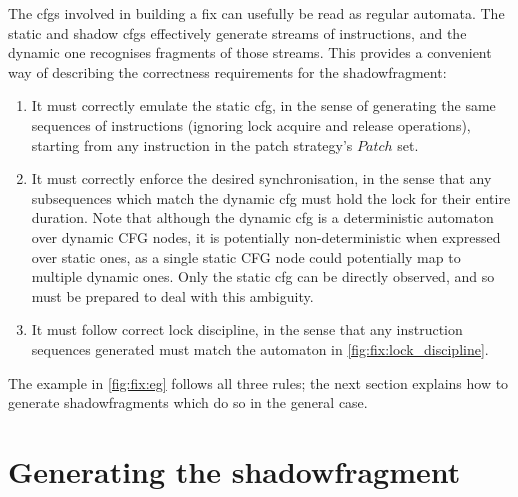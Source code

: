 The \glspl{cfg} involved in building a fix can usefully be read as
regular automata.  The static and shadow \glspl{cfg} effectively
generate streams of instructions, and the dynamic one recognises
fragments of those streams.  This provides a convenient way of
describing the correctness requirements for the \gls{shadowfragment}:
\begin{enumerate}
\item It must correctly emulate the \gls{static cfg}, in the sense of
  generating the same sequences of instructions (ignoring lock acquire
  and release operations), starting from any instruction in the patch
  strategy's $\mathit{Patch}$ set.
\item It must correctly enforce the desired synchronisation, in the
  sense that any subsequences which match the \gls{dynamic cfg} must
  hold the lock for their entire duration.  Note that although the
  \gls{dynamic cfg} is a deterministic automaton over dynamic CFG
  nodes, it is potentially non-deterministic when expressed over
  static ones, as a single static CFG node could potentially map to
  multiple dynamic ones.  Only the \gls{static cfg} can be directly
  observed, and so {\technique} must be prepared to deal with this
  ambiguity.
\item It must follow correct lock discipline, in the sense that any
  instruction sequences generated must match the automaton in
  \autoref{fig:fix:lock_discipline}.
\end{enumerate}
The example in \autoref{fig:fix:eg} follows all three rules; the next
section explains how to generate \glspl{shadowfragment} which do so in
the general case.

\section[Generating the \glsentrytext{shadowfragment}]{Generating the \gls{shadowfragment}}
\label{sect:fixing:shadowfrag}

